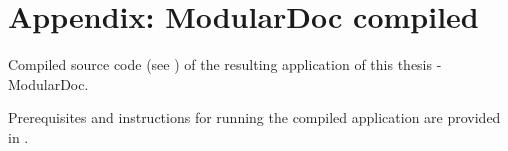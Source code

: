 \section*{Appendix: ModularDoc compiled} \label{app:modularDocCompiled}

Compiled source code (see ) of the resulting application of this thesis - ModularDoc.

Prerequisites and instructions for running the compiled application are provided in .